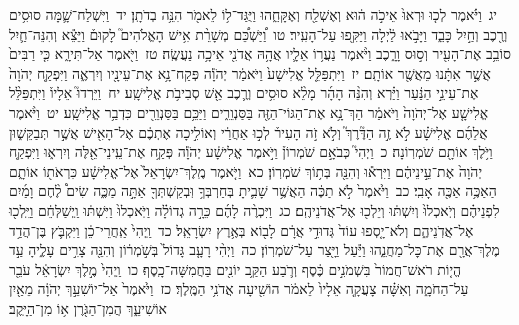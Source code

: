 \documentclass[18pt]{article}
\newcommand{\kri}[1]{\Afootnote{#1}}	%
\begin{document}
 {\loc יג~}וַיֹּ֗אמֶר לְכ֤וּ וּרְאוּ֙ אֵיכֹ֣ה ה֔וּא וְאֶשְׁלַ֖ח וְאֶקָּחֵ֑הוּ וַיֻּגַּד־ל֥וֹ לֵאמֹ֖ר הִנֵּ֥ה בְדֹתָֽן׃ \startlock
 {\loc יד~}וַיִּשְׁלַח־שָׁ֛מָּה סוּסִ֥ים וְרֶ֖כֶב וְחַ֣יִל כָּבֵ֑ד וַיָּבֹ֣אוּ לַ֔יְלָה וַיַּקִּ֖פוּ עַל־הָעִֽיר׃ \startlock
 {\loc טו~}וַ֠יַּשְׁכֵּ֠ם מְשָׁרֵ֨ת אִ֥ישׁ הָאֱלֹהִים֮ לָקוּם֒ וַיֵּצֵ֕א וְהִנֵּה־חַ֛יִל סוֹבֵ֥ב אֶת־הָעִ֖יר וְס֣וּס וָרָ֑כֶב וַיֹּ֨אמֶר נַעֲר֥וֹ אֵלָ֛יו אֲהָ֥הּ אֲדֹנִ֖י אֵיכָ֥ה נַעֲשֶֽׂה׃ \startlock
 {\loc טז~}וַיֹּ֖אמֶר אַל־תִּירָ֑א כִּ֤י רַבִּים֙ אֲשֶׁ֣ר אִתָּ֔נוּ מֵאֲשֶׁ֖ר אוֹתָֽם׃ \startlock
 {\loc יז~}וַיִּתְפַּלֵּ֤ל אֱלִישָׁע֙ וַיֹּאמַ֔ר יְהֹוָ֕ה פְּקַח־נָ֥א אֶת־עֵינָ֖יו וְיִרְאֶ֑ה וַיִּפְקַ֤ח יְהֹוָה֙ אֶת־עֵינֵ֣י הַנַּ֔עַר וַיַּ֗רְא וְהִנֵּ֨ה הָהָ֜ר מָלֵ֨א סוּסִ֥ים וְרֶ֛כֶב אֵ֖שׁ סְבִיבֹ֥ת אֱלִישָֽׁע׃ \startlock
 {\loc יח~}וַיֵּרְדוּ֮ אֵלָיו֒ וַיִּתְפַּלֵּ֨ל אֱלִישָׁ֤ע אֶל־יְהֹוָה֙ וַיֹּאמַ֔ר הַךְ־נָ֥א אֶת־הַגּוֹי־הַזֶּ֖ה בַּסַּנְוֵרִ֑ים וַיַּכֵּ֥ם בַּסַּנְוֵרִ֖ים כִּדְבַ֥ר אֱלִישָֽׁע׃ \startlock
 {\loc יט~}וַיֹּ֨אמֶר אֲלֵהֶ֜ם אֱלִישָׁ֗ע לֹ֣א זֶ֣ה הַדֶּ֘רֶךְ֮ וְלֹ֣א זֹ֣ה הָעִיר֒ לְכ֣וּ אַחֲרַ֔י וְאוֹלִ֣יכָה אֶתְכֶ֔ם אֶל־הָאִ֖ישׁ אֲשֶׁ֣ר תְּבַקֵּשׁ֑וּן וַיֹּ֥לֶךְ אוֹתָ֖ם שֹׁמְרֽוֹנָה׃ \startlock
 {\loc כ~}וַיְהִי֮ כְּבֹאָ֣ם שֹׁמְרוֹן֒ וַיֹּ֣אמֶר אֱלִישָׁ֔ע יְהֹוָ֕ה פְּקַ֥ח אֶת־עֵֽינֵי־אֵ֖לֶּה וְיִרְא֑וּ וַיִּפְקַ֤ח יְהֹוָה֙ אֶת־עֵ֣ינֵיהֶ֔ם וַיִּרְא֕וּ וְהִנֵּ֖ה בְּת֥וֹךְ שֹׁמְרֽוֹן׃ \startlock
 {\loc כא~}וַיֹּ֤אמֶר מֶֽלֶךְ־יִשְׂרָאֵל֙ אֶל־אֱלִישָׁ֔ע כִּרְאֹת֖וֹ אוֹתָ֑ם הַאַכֶּ֥ה אַכֶּ֖ה אָבִֽי׃ \startlock
 {\loc כב~}וַיֹּ֙אמֶר֙ לֹ֣א תַכֶּ֔ה הַאֲשֶׁ֥ר שָׁבִ֛יתָ בְּחַרְבְּךָ֥ וּֽבְקַשְׁתְּךָ֖ אַתָּ֣ה מַכֶּ֑ה שִׂים֩ לֶ֨חֶם וָמַ֜יִם לִפְנֵיהֶ֗ם וְיֹֽאכְלוּ֙ וְיִשְׁתּ֔וּ וְיֵלְכ֖וּ אֶל־אֲדֹנֵיהֶֽם׃ \startlock
 {\loc כג~}וַיִּכְרֶ֨ה לָהֶ֜ם כֵּרָ֣ה גְדוֹלָ֗ה וַיֹּֽאכְלוּ֙ וַיִּשְׁתּ֔וּ וַֽיְשַׁלְּחֵ֔ם וַיֵּֽלְכ֖וּ אֶל־אֲדֹֽנֵיהֶ֑ם וְלֹא־יָ֤סְפוּ עוֹד֙ גְּדוּדֵ֣י אֲרָ֔ם לָב֖וֹא בְּאֶ֥רֶץ יִשְׂרָאֵֽל׃ \startlock
 {\loc כד~}וַֽיְהִי֙ אַֽחֲרֵי־כֵ֔ן וַיִּקְבֹּ֛ץ בֶּן־הֲדַ֥ד מֶלֶךְ־אֲרָ֖ם אֶת־כׇּל־מַחֲנֵ֑הוּ וַיַּ֕עַל וַיָּ֖צַר עַל־שֹׁמְרֽוֹן׃ \startlock
 {\loc כה~}וַיְהִ֨י רָעָ֤ב גָּדוֹל֙ בְּשֹׁ֣מְר֔וֹן וְהִנֵּ֖ה צָרִ֣ים עָלֶ֑יהָ עַ֣ד הֱי֤וֹת רֹאשׁ־חֲמוֹר֙ בִּשְׁמֹנִ֣ים כֶּ֔סֶף וְרֹ֛בַע הַקַּ֥ב  \edtext{(חרי)}{\kri{קרי: דִּב־}} יוֹנִ֖ים בַּחֲמִשָּׁה־כָֽסֶף׃ \startlock
 {\loc כו~}וַֽיְהִי֙ מֶ֣לֶךְ יִשְׂרָאֵ֔ל עֹבֵ֖ר עַל־הַחֹמָ֑ה וְאִשָּׁ֗ה צָעֲקָ֤ה אֵלָיו֙ לֵאמֹ֔ר הוֹשִׁ֖יעָה אֲדֹנִ֥י הַמֶּֽלֶךְ׃ \startlock
 {\loc כז~}וַיֹּ֙אמֶר֙ אַל־יוֹשִׁעֵ֣ךְ יְהֹוָ֔ה מֵאַ֖יִן אוֹשִׁיעֵ֑ךְ הֲמִן־הַגֹּ֖רֶן א֥וֹ מִן־הַיָּֽקֶב׃ \startlock
\end{document}
